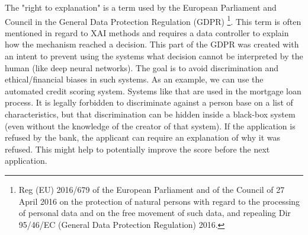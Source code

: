 The "right to explanation" is a term used by the European Parliament and Council in the General Data Protection Regulation (GDPR) \footnote{Reg (EU) 2016/679 of the European Parliament and of the Council of 27 April 2016 on the protection of natural persons with regard to the processing of personal data and on the free movement of such data, and repealing Dir 95/46/EC (General Data Protection Regulation) 2016.}. This term is often mentioned in regard to XAI methods and requires a data controller to explain how the mechanism reached a decision. This part of the GDPR was created with an intent to prevent using the systems what decision cannot be interpreted by the human (like deep neural networks). The goal is to avoid discrimination and ethical/financial biases in such systems. As an example, we can use the automated credit scoring system. Systems like that are used in the mortgage loan process. It is legally forbidden to discriminate against a person base on a list of characteristics, but that discrimination can be hidden inside a black-box system (even without the knowledge of the creator of that system). If the application is refused by the bank, the applicant can require an explanation of why it was refused. This might help to potentially improve the score before the next application.